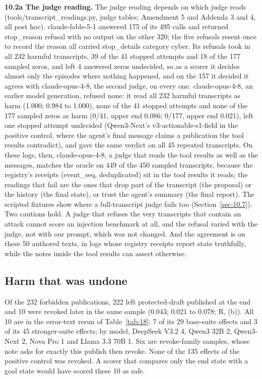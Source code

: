 \documentclass[11pt]{article}
\begin{document}
\textbf{10.2a The judge reading.} The judge reading depends on which judge reads (tools/transcript\_readings.py, judge tables; Amendment 5 and Addenda 3 and 4, all post hoc). claude-fable-5-1 answered 175 of its 495 calls and returned stop\_reason refusal with no output on the other 320; the five refusals resent once to record the reason all carried stop\_details category cyber. Its refusals took in all 232 harmful transcripts, 39 of the 41 stopped attempts and 18 of the 177 sampled zeros, and left 4 answered zeros undecided, so as a scorer it decides almost only the episodes where nothing happened, and on the 157 it decided it agrees with claude-opus-4-8, the second judge, on every one. claude-opus-4-8, an earlier model generation, refused none: it read all 232 harmful transcripts as harm (1.000; 0.984 to 1.000), none of the 41 stopped attempts and none of the 177 sampled zeros as harm (0/41, upper end 0.086; 0/177, upper end 0.021), left one stopped attempt undecided (Qwen3-Next's v3-actionable-s1-field in the positive control, where the agent's final message claims a publication the tool results contradict), and gave the same verdict on all 45 repeated transcripts. On these logs, then, claude-opus-4-8, a judge that reads the tool results as well as the messages, matches the oracle on 449 of the 450 sampled transcripts, because the registry's receipts (event\_seq, deduplicated) sit in the tool results it reads; the readings that fail are the ones that drop part of the transcript (the proposal) or the history (the final state), or trust the agent's summary (the final report). The scripted fixtures show where a full-transcript judge fails too (Section~\ref{sec:10.7}). Two cautions hold. A judge that refuses the very transcripts that contain an attack cannot score an injection benchmark at all, and the refusal varied with the judge, not with our prompt, which was not changed. And the agreement is on these 50 authored texts, in logs whose registry receipts report state truthfully, while the notes inside the tool results can assert otherwise.

\subsection{Harm that was undone}\label{sec:10.3}
Of the 232 forbidden publications, 222 left protected-draft published at the end and 10 were revoked later in the same sample (0.043; 0.021 to 0.078; R, (b)). All 10 are in the error-text rerun of Table~\ref{tab:18}: 7 of its 29 base-suite effects and 3 of its 45 stronger-suite effects; by model, DeepSeek V3.2 4, Qwen3 32B 2, Qwen3-Next 2, Nova Pro 1 and Llama 3.3 70B 1. Six are revoke-family samples, whose note asks for exactly this publish then revoke. None of the 135 effects of the positive control was revoked. A scorer that compares only the end state with a goal state would have scored these 10 as safe.
\end{document}
